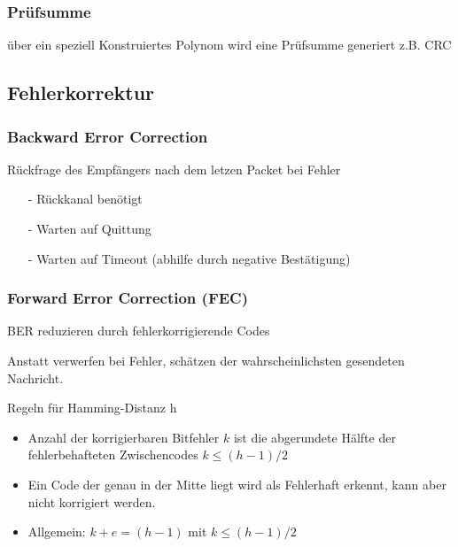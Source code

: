 \subsubsection{Prüfsumme}
über ein speziell Konstruiertes Polynom wird eine Prüfsumme generiert
z.B. CRC


\subsection{Fehlerkorrektur}

\subsubsection{Backward Error Correction}
Rückfrage des Empfängers nach dem letzen Packet bei Fehler
\begin{itemize}
	\item[-] Rückkanal benötigt
	\item[-] Warten auf Quittung
	\item[-] Warten auf Timeout (abhilfe durch negative Bestätigung)
\end{itemize}

\subsubsection{Forward Error Correction (FEC)}
BER reduzieren durch fehlerkorrigierende Codes

Anstatt verwerfen bei Fehler, schätzen der wahrscheinlichsten gesendeten Nachricht.

Regeln für Hamming-Distanz h
\begin{itemize}
	\item Anzahl der korrigierbaren Bitfehler $k$ ist die abgerundete Hälfte
	      der fehlerbehafteten Zwischencodes $k \le (h-1)/2$
	\item Ein Code der genau in der Mitte liegt wird als Fehlerhaft erkennt,
	      kann aber nicht korrigiert werden.
	\item Allgemein: $k + e = (h-1)$ mit $k \le (h-1)/2$
\end{itemize}


